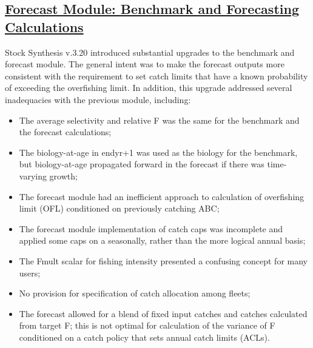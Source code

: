 \hypertarget{appendB}{}
\subsection[Forecast Module: Benchmark and Forecasting Calculations]{\protect\hyperlink{appendB}{Forecast Module: Benchmark and Forecasting Calculations}}\label{sec:forecast}

Stock Synthesis v.3.20 introduced substantial upgrades to the benchmark and forecast module. The general intent was to make the forecast outputs more consistent with the requirement to set catch limits that have a known probability of exceeding the overfishing limit. In addition, this upgrade addressed several inadequacies with the previous module, including:

\begin{itemize}
	\item The average selectivity and relative F was the same for the benchmark and the forecast calculations;
	\item The biology-at-age in endyr+1 was used as the biology for the benchmark, but biology-at-age propagated forward in the forecast if there was time-varying growth;
	\item The forecast module had an inefficient approach to calculation of overfishing limit (OFL) conditioned on previously catching ABC;
	\item The forecast module implementation of catch caps was incomplete and applied some caps on a seasonally, rather than the more logical annual basis;
	\item The Fmult scalar for fishing intensity presented a confusing concept for many users;
	\item No provision for specification of catch allocation among fleets;
	\item The forecast allowed for a blend of fixed input catches and catches calculated from target F; this is not optimal for calculation of the variance of F conditioned on a catch policy that sets annual catch limits (ACLs).
\end{itemize}

